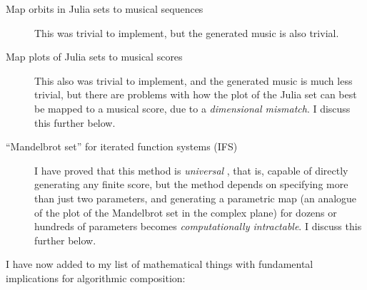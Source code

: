 \documentclass[11pt]{amsart}
\begin{document}
\begin{description}
\item[Map orbits in Julia sets to musical sequences] This was trivial to implement, but the generated music is also trivial.
\item[Map plots of Julia sets to musical scores] This also was trivial to implement, and the generated music is much less trivial, but there are problems with how the plot of the Julia set can best be mapped to a musical score, due to a \emph{dimensional mismatch}. I discuss this further below.
\item[``Mandelbrot set'' for iterated function systems (IFS)] I have proved that this method is \emph{universal} \cite{obsessed, gogins2023scoregraphs}, that is, capable of directly generating any finite score, but the method depends on specifying more than just two parameters, and generating a parametric map (an analogue of the plot of the Mandelbrot set in the complex plane) for dozens or hundreds of parameters becomes \emph{computationally intractable}. I discuss this further below.
\end{description}

I have now added to my list of mathematical things with fundamental implications for algorithmic composition:
\end{document}
